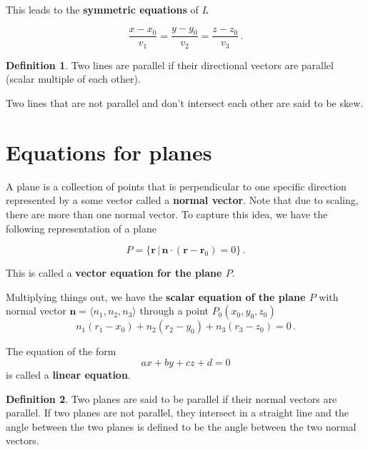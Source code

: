 \documentclass[
]{book}
\theoremstyle{definition}
\newtheorem{definition}{Definition}[chapter]
\theoremstyle{definition}
\theoremstyle{definition}
\theoremstyle{definition}
\theoremstyle{remark}
\begin{document}
This leads to the \textbf{symmetric equations} of \(L\)

\begin{equation*}
    \frac{x - x_0}{v_1} = \frac{y - y_0}{v_2} = \frac{z - z_0}{v_3} \,.
\end{equation*}

\begin{definition}
Two lines are parallel if their directional vectors are parallel (scalar multiple of each other).

Two lines that are not parallel and don't intersect each other are said to be skew.
\end{definition}

\hypertarget{equations-for-planes}{%
\section{Equations for planes}\label{equations-for-planes}}

A plane is a collection of points that is perpendicular to one specific direction
represented by a some vector called a \textbf{normal vector}.
Note that due to scaling, there are more than one normal vector.
To capture this idea, we have the following representation of a plane

\begin{equation*}
    P = \{ \mathbf{r} \, | \, \mathbf{n} \cdot (\mathbf{r}- \mathbf{r}_0 ) = 0 \} \,.
\end{equation*}

This is called a \textbf{vector equation for the plane \(P\)}.

Multiplying things out, we have the \textbf{scalar equation of the plane \(P\)} with
normal vector \(\mathbf{n} = \langle n_1, n_2, n_3 \rangle\) through a point \(P_0(x_0, y_0, z_0)\)
\begin{equation*}
    n_1(r_1- x_0) + n_2 (r_2 - y_0) + n_3(r_3 - z_0) = 0 \,.
\end{equation*}

The equation of the form
\begin{equation*}
    ax + by + cz + d = 0 
\end{equation*}
is called a \textbf{linear equation}.

\begin{definition}
Two planes are said to be parallel if their normal vectors are parallel.
If two planes are not parallel, they intersect in a straight line and
the angle between the two planes is defined to be the angle between the
two normal vectors.
\end{definition}
\end{document}
